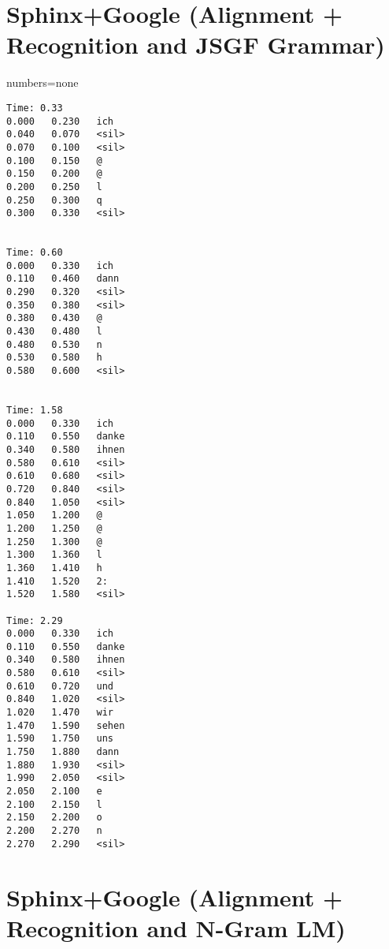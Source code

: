 \section {Sphinx+Google (Alignment + Recognition and JSGF Grammar)}
  {numbers=none} 
  
\begin{lstlisting}[style=nonumbers]
Time: 0.33
0.000	0.230	ich
0.040	0.070	<sil>
0.070	0.100	<sil>
0.100	0.150	@
0.150	0.200	@
0.200	0.250	l
0.250	0.300	q
0.300	0.330	<sil>


Time: 0.60
0.000	0.330	ich
0.110	0.460	dann
0.290	0.320	<sil>
0.350	0.380	<sil>
0.380	0.430	@
0.430	0.480	l
0.480	0.530	n
0.530	0.580	h
0.580	0.600	<sil>


Time: 1.58
0.000	0.330	ich
0.110	0.550	danke
0.340	0.580	ihnen
0.580	0.610	<sil>
0.610	0.680	<sil>
0.720	0.840	<sil>
0.840	1.050	<sil>
1.050	1.200	@
1.200	1.250	@
1.250	1.300	@
1.300	1.360	l
1.360	1.410	h
1.410	1.520	2:
1.520	1.580	<sil>

Time: 2.29
0.000	0.330	ich
0.110	0.550	danke
0.340	0.580	ihnen
0.580	0.610	<sil>
0.610	0.720	und
0.840	1.020	<sil>
1.020	1.470	wir
1.470	1.590	sehen
1.590	1.750	uns
1.750	1.880	dann
1.880	1.930	<sil>
1.990	2.050	<sil>
2.050	2.100	e
2.100	2.150	l
2.150	2.200	o
2.200	2.270	n
2.270	2.290	<sil>

\end{lstlisting}
\section {Sphinx+Google (Alignment + Recognition and
N-Gram LM)}

